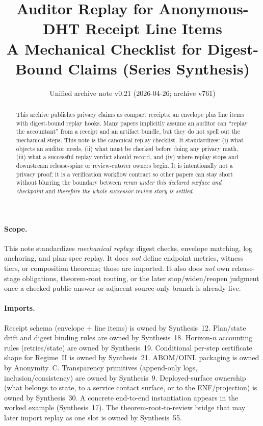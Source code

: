 \documentclass[11pt]{article}
\title{Auditor Replay for Anonymous-DHT Receipt Line Items\\
\large A Mechanical Checklist for Digest-Bound Claims (Series Synthesis)}
\author{}
\date{Unified archive note v0.21 (2026-04-26; archive v761)}
\begin{document}
\maketitle

\begin{abstract}
This archive publishes privacy claims as compact receipts: an envelope plus line items with digest-bound replay hooks.
Many papers implicitly assume an auditor can ``replay the accountant'' from a receipt and an artifact bundle, but they do not spell out the mechanical steps.
This note is the canonical replay checklist.
It standardizes: (i) what objects an auditor needs, (ii) what must be checked before doing any privacy math, (iii) what a successful replay verdict should record, and (iv) where replay stops and downstream release-spine or review-cutover owners begin.
It is intentionally not a privacy proof; it is a verification workflow contract so other papers can stay short without blurring the boundary between \emph{reran under this declared surface and checkpoint} and \emph{therefore the whole successor-review story is settled}.
\end{abstract}

\paragraph{Scope.}
This note standardizes \emph{mechanical replay}: digest checks, envelope matching, log anchoring, and plan-spec replay.
It does \emph{not} define endpoint metrics, witness tiers, or composition theorems; those are imported.
It also does \emph{not} own release-stage obligations, theorem-root routing, or the later stop/widen/reopen judgment once a checked public answer or adjacent source-only branch is already live.

\paragraph{Imports.}
Receipt schema (envelope + line items) is owned by Synthesis~12.\cite{series:receiptitems}
Plan/state drift and digest binding rules are owned by Synthesis~18.\cite{series:planstateequiv}
Horizon-$n$ accounting rules (retries/state) are owned by Synthesis~19.\cite{series:accountingrulebook}
Conditional per-step certificate shape for Regime~II is owned by Synthesis~21.\cite{series:condcert}
ABOM/OINL packaging is owned by Anonymity~C.\cite{series:abomoinl}
Transparency primitives (append-only logs, inclusion/consistency) are owned by Synthesis~9.\cite{series:transparencyprimitives}
Deployed-surface ownership (what belongs to state, to a service contact surface, or to the ENF/projection) is owned by Synthesis~30.\cite{series:deployedsurfaces}
A concrete end-to-end instantiation appears in the worked example (Synthesis~17).\cite{series:workedexample}
The theorem-root-to-review bridge that may later import replay as one slot is owned by Synthesis~55.\cite{series:seriesspines}
\end{document}

